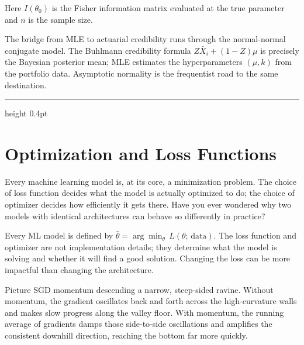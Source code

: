 \documentclass[12pt,a4paper]{article}
\begin{document}
Here $I(\theta_0)$ is the Fisher information matrix evaluated at the true
parameter and $n$ is the sample size.

\begin{mentalmodel}
The bridge from MLE to actuarial credibility runs through the normal-normal
conjugate model. The Buhlmann credibility formula
$Z\bar{X}_i + (1-Z)\mu$ is precisely the Bayesian posterior mean; MLE
estimates the hyperparameters $(\mu, k)$ from the portfolio data.
Asymptotic normality is the frequentist road to the same destination.
\end{mentalmodel}

\vspace{10pt}\hrule height 0.4pt\vspace{14pt}

\section*{Optimization and Loss Functions}

Every machine learning model is, at its core, a minimization problem.
The choice of loss function decides what the model is actually optimized
to do; the choice of optimizer decides how efficiently it gets there.
Have you ever wondered why two models with identical architectures can
behave so differently in practice?

\begin{concept}
Every ML model is defined by
$\hat\theta = \arg\min_\theta\, L(\theta;\,\text{data})$.
The loss function and optimizer are not implementation details; they
determine what the model is solving and whether it will find a good
solution. Changing the loss can be more impactful than changing the
architecture.
\end{concept}

\begin{analogy}
Picture SGD momentum descending a narrow, steep-sided ravine. Without
momentum, the gradient oscillates back and forth across the high-curvature
walls and makes slow progress along the valley floor. With momentum, the
running average of gradients damps those side-to-side oscillations and
amplifies the consistent downhill direction, reaching the bottom far more
quickly.
\end{analogy}
\end{document}
